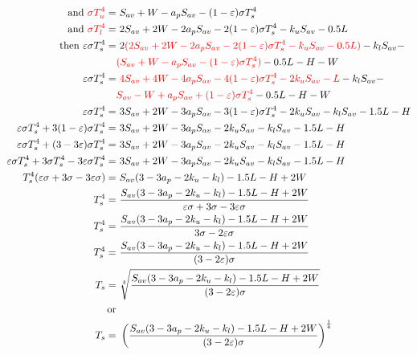 \documentclass[11pt]{article}
\begin{document}
\begin{enumerate}
\begin{align*}
	\text{and }\textcolor{red}{\sigma T_{u}^{4}} =&\ S_{av} + W - a_{p}S_{av} - (1 - \varepsilon)\sigma T_{s}^{4}\\
	\text{and }\textcolor{red}{\sigma T_{l}^{4}} =&\ 2S_{av} + 2W - 2a_{p}S_{av} - 2(1 - \varepsilon)\sigma T_{s}^{4} - k_{u}S_{av} - 0.5L \\
	\text{then } \varepsilon\sigma T_{s}^{4} =&\ 2\textcolor{red}{(2S_{av} + 2W - 2a_{p}S_{av} - 2(1 - \varepsilon)\sigma T_{s}^{4} - k_{u}S_{av} - 0.5L)} - k_{l}S_{av} - \\& \textcolor{red}{(S_{av} + W - a_{p}S_{av} - (1 - \varepsilon)\sigma T_{s}^{4})} - 0.5L - H - W \\
	\varepsilon\sigma T_{s}^{4} =&\ \textcolor{red}{4S_{av} + 4W - 4a_{p}S_{av} - 4(1-\varepsilon)\sigma T_{s}^{4} - 2k_{u}S_{av} - L} - k_{l}S_{av} - \\& \textcolor{red}{S_{av} - W + a_{p}S_{av} + (1 - \varepsilon)\sigma T_{s}^{4}} - 0.5L - H - W\\
	\varepsilon\sigma T_{s}^{4} =&\ 3S_{av}+2W-3a_{p}S_{av}-3(1-\varepsilon)\sigma T_{s}^{4}-2k_{u}S_{av}-k_{l}S_{av}-1.5L-H\\
	\varepsilon\sigma T_{s}^{4}+3(1-\varepsilon)\sigma T_{s}^{4} =&\ 3S_{av}+2W-3a_{p}S_{av}-2k_{u}S_{av}-k_{l}S_{av}-1.5L-H\\
	\varepsilon\sigma T_{s}^{4}+(3 -3\varepsilon)\sigma T_{s}^{4} =&\ 3S_{av}+2W-3a_{p}S_{av}-2k_{u}S_{av}-k_{l}S_{av}-1.5L-H\\
	\varepsilon\sigma T_{s}^{4}+3\sigma T_{s}^{4}-3\varepsilon \sigma T_{s}^{4} =&\ 3S_{av}+2W-3a_{p}S_{av}-2k_{u}S_{av}-k_{l}S_{av}-1.5L-H\\
	T_{s}^{4}(\varepsilon\sigma+3\sigma-3\varepsilon\sigma)=&\ S_{av}(3-3a_{p}-2k_{u}-k_{l})-1.5L - H +2W\\
	T_{s}^{4}=&\ \frac{S_{av}(3-3a_{p}-2k_{u}-k_{l})-1.5L - H +2W}{\varepsilon\sigma+3\sigma-3\varepsilon\sigma}\\
	T_{s}^{4}=&\ \frac{S_{av}(3-3a_{p}-2k_{u}-k_{l})-1.5L - H +2W}{3\sigma-2\varepsilon\sigma}\\
	T_{s}^{4}=&\ \frac{S_{av}(3-3a_{p}-2k_{u}-k_{l})-1.5L - H +2W}{(3-2\varepsilon)\sigma}\\
	T_{s}=&\  \sqrt[4]{\frac{S_{av}(3-3a_{p}-2k_{u}-k_{l})-1.5L - H +2W}{(3-2\varepsilon)\sigma}}\\
	\text{or}&\\
	T_{s}=&\  \left(\frac{S_{av}(3-3a_{p}-2k_{u}-k_{l})-1.5L - H +2W}{(3-2\varepsilon)\sigma}\right)^{\frac{1}{4}}
\end{align*}

\end{enumerate}
\end{document}
